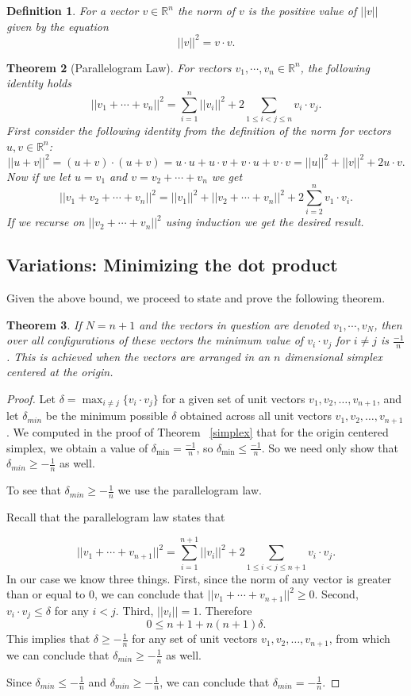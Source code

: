\documentclass[11pt,letterpaper,twoside,english]{article}
\theoremstyle{theorem}
\newtheorem{theorem}{Theorem}[section]
\newtheorem{definition}[theorem]{Definition}
\theoremstyle{remark}
\providecommand{\R}{\mathbb{R}}
\begin{document}
\begin{definition}
For a vector $v\in\R^n$ the norm of $v$ is the positive value of $||v||$ given by the equation
$$
||v||^2=v\cdot v.
$$
\end{definition}
\begin{theorem}[Parallelogram Law]
For vectors $v_1,\cdots,v_n\in\R^n$, the following identity holds
$$
||v_1+\cdots+v_n||^2=\displaystyle\sum_{i=1}^n||v_i||^2+2\displaystyle\sum_{1\le i<j\le n}v_i\cdot v_j.
$$
\proof
First consider the following identity from the definition of the norm for vectors $u,v\in\R^n$:
$$
||u+v||^2=(u+v)\cdot (u+v)=u\cdot u+u\cdot v+ v\cdot u + v\cdot v=||u||^2+||v||^2+2u\cdot v.
$$
Now if we let $u=v_1$ and $v= v_2+\cdots+v_n$ we get 
$$
||v_1+v_2+\cdots+v_n||^2=||v_1||^2+||v_2+\cdots +v_n||^2+2\sum_{i=2}^n v_1\cdot v_i.
$$
If we recurse on $||v_2+\cdots +v_n||^2$ using induction we get the desired result. 
\end{theorem}


\subsection{Variations: Minimizing the dot product}
Given the above bound, we proceed to state and prove the following theorem.


\begin{theorem}
If $N=n+1$ and the vectors in question are denoted $v_1,\cdots, v_N$, then over all configurations of these vectors the minimum value of $v_i\cdot v_j$ for $i\neq j$ is $\frac{-1}{n}$. This is achieved when the vectors are arranged in an $n$ dimensional simplex centered at the origin.  
\end{theorem}

\begin{proof}
Let $\delta= \max_{i\neq j}\{v_i\cdot v_j\}$ for a given set of unit vectors $v_1, v_2, \ldots, v_{n+1}$, and let $\delta_{min}$ be the minimum possible $\delta$ obtained across all unit vectors $v_1, v_2, \ldots, v_{n+1}$. We computed in the proof of Theorem ~\ref{simplex} that for the origin centered simplex, we obtain a value of $\delta_{\min}=\frac{-1}{n}$, so $\delta_{\min}\le\frac{-1}{n}$. So we need only show that $\delta_{min} \geq -\frac{1}{n}$ as well. 


To see that $\delta_{min} \ge-\frac{1}{n}$ we use the parallelogram law.

Recall that the parallelogram law states that 

$$
||v_1+\cdots+v_{n+1}||^2=\displaystyle\sum_{i=1}^{n+1}||v_i||^2+2\displaystyle\sum_{1\le i<j\le n+1}v_i\cdot v_j.
$$
In our case we know three things. First, since the norm of any vector is greater than or equal to $0$, we can conclude that $||v_1 + \cdots + v_{n+1}||^2 \geq 0$. Second, $v_i\cdot v_j\le\delta$ for any $i<j$. Third, $||v_i||=1$. Therefore 
$$
0\le n+1+n(n+1)\delta.
$$
This implies that $\delta\ge -\frac{1}{n}$ for any set of unit vectors $v_1, v_2, \ldots, v_{n+1}$, from which we can conclude that $\delta_{min} \ge -\frac{1}{n}$ as well.

Since $\delta_{min} \le -\frac{1}{n}$ and $\delta_{min} \ge -\frac{1}{n}$, we can conclude that $\delta_{min}=-\frac{1}{n}$.
\end{proof}
\end{document}
